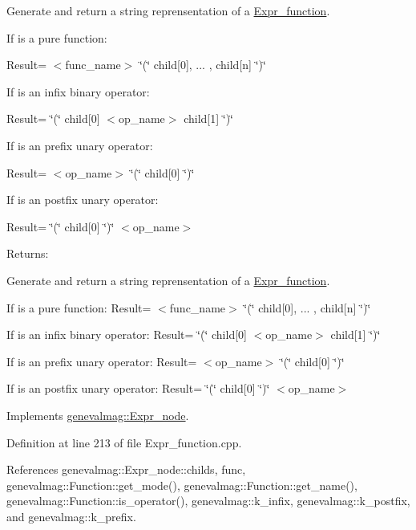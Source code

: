 Generate and return a string reprensentation of a \hyperlink{classgenevalmag_1_1Expr__function}{Expr\_\-function}.\par
 \par
 If is a pure function:\par
 Result= $<$func\_\-name$>$ \char`\"{}(\char`\"{} child\mbox{[}0\mbox{]}, ... , child\mbox{[}n\mbox{]} \char`\"{})\char`\"{}\par
 \par
 If is an infix binary operator:\par
 Result= \char`\"{}(\char`\"{} child\mbox{[}0\mbox{]} $<$op\_\-name$>$ child\mbox{[}1\mbox{]} \char`\"{})\char`\"{}\par
 \par
 If is an prefix unary operator:\par
 Result= $<$op\_\-name$>$ \char`\"{}(\char`\"{} child\mbox{[}0\mbox{]} \char`\"{})\char`\"{}\par
 \par
 If is an postfix unary operator:\par
 Result= \char`\"{}(\char`\"{} child\mbox{[}0\mbox{]} \char`\"{})\char`\"{} $<$op\_\-name$>$\par
 \begin{Desc}
\item[Returns:]\end{Desc}
Generate and return a string reprensentation of a \hyperlink{classgenevalmag_1_1Expr__function}{Expr\_\-function}.

If is a pure function: Result= $<$func\_\-name$>$ \char`\"{}(\char`\"{} child\mbox{[}0\mbox{]}, ... , child\mbox{[}n\mbox{]} \char`\"{})\char`\"{}

If is an infix binary operator: Result= \char`\"{}(\char`\"{} child\mbox{[}0\mbox{]} $<$op\_\-name$>$ child\mbox{[}1\mbox{]} \char`\"{})\char`\"{}

If is an prefix unary operator: Result= $<$op\_\-name$>$ \char`\"{}(\char`\"{} child\mbox{[}0\mbox{]} \char`\"{})\char`\"{}

If is an postfix unary operator: Result= \char`\"{}(\char`\"{} child\mbox{[}0\mbox{]} \char`\"{})\char`\"{} $<$op\_\-name$>$ 

Implements \hyperlink{classgenevalmag_1_1Expr__node_dea1d8fbc1b01f018e18cedad871f6a7}{genevalmag::Expr\_\-node}.

Definition at line 213 of file Expr\_\-function.cpp.

References genevalmag::Expr\_\-node::childs, func, genevalmag::Function::get\_\-mode(), genevalmag::Function::get\_\-name(), genevalmag::Function::is\_\-operator(), genevalmag::k\_\-infix, genevalmag::k\_\-postfix, and genevalmag::k\_\-prefix.

